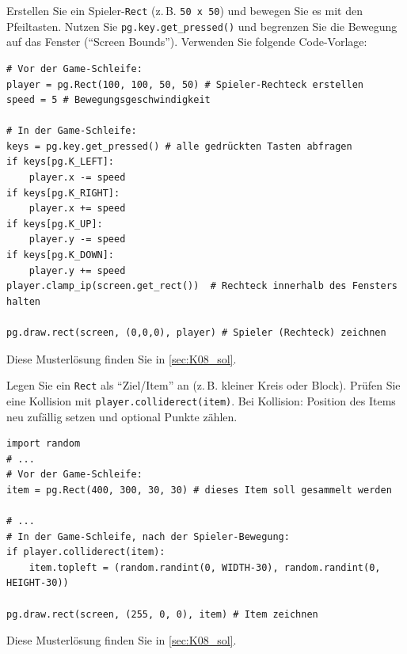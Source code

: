\begin{myexercise}\label{myexercise:Bewegungen}
    Erstellen Sie ein Spieler-\lstinline|Rect| (z.\,B. \lstinline|50 x 50|) und bewegen Sie es mit den Pfeiltasten. Nutzen Sie \lstinline|pg.key.get_pressed()| und begrenzen Sie die Bewegung auf das Fenster (\enquote{Screen Bounds}). Verwenden Sie folgende Code-Vorlage:
    \begin{lstlisting}
# Vor der Game-Schleife:
player = pg.Rect(100, 100, 50, 50) # Spieler-Rechteck erstellen
speed = 5 # Bewegungsgeschwindigkeit

# In der Game-Schleife:
keys = pg.key.get_pressed() # alle gedrückten Tasten abfragen
if keys[pg.K_LEFT]:
	player.x -= speed
if keys[pg.K_RIGHT]:
	player.x += speed
if keys[pg.K_UP]:
	player.y -= speed
if keys[pg.K_DOWN]:
	player.y += speed
player.clamp_ip(screen.get_rect())  # Rechteck innerhalb des Fensters halten

pg.draw.rect(screen, (0,0,0), player) # Spieler (Rechteck) zeichnen
\end{lstlisting}
	\begin{myanswer}
		Diese Musterlösung finden Sie in \cref{sec:K08_sol}.
	\end{myanswer}
\end{myexercise}

\begin{myexercise}[Kollisionen]\label{myexercise:Kollisionen}
    Legen Sie ein \lstinline|Rect| als \enquote{Ziel/Item} an (z.\,B. kleiner Kreis oder Block). Prüfen Sie eine Kollision mit \lstinline|player.colliderect(item)|. Bei Kollision: Position des Items neu zufällig setzen und optional Punkte zählen.
    \begin{lstlisting}
import random
# ...
# Vor der Game-Schleife:
item = pg.Rect(400, 300, 30, 30) # dieses Item soll gesammelt werden

# ...
# In der Game-Schleife, nach der Spieler-Bewegung:
if player.colliderect(item):
	item.topleft = (random.randint(0, WIDTH-30), random.randint(0, HEIGHT-30))

pg.draw.rect(screen, (255, 0, 0), item) # Item zeichnen
\end{lstlisting}
	\begin{myanswer}
		Diese Musterlösung finden Sie in \cref{sec:K08_sol}.
	\end{myanswer}
\end{myexercise}

